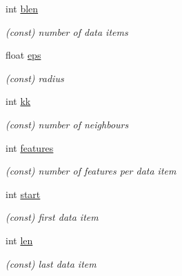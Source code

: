 \begin{DoxyCompactItemize}
\mbox{\label{structdbscan__pt_ac172b388c85db693e07e954f7d29e681}} 
int \mbox{\hyperlink{structdbscan__pt_ac172b388c85db693e07e954f7d29e681}{blen}}
\begin{DoxyCompactList}\small\item\em (const) number of data items \end{DoxyCompactList}\item 
\mbox{\label{structdbscan__pt_ae73ddeeaca04d08756b022115639d607}} 
float \mbox{\hyperlink{structdbscan__pt_ae73ddeeaca04d08756b022115639d607}{eps}}
\begin{DoxyCompactList}\small\item\em (const) radius \end{DoxyCompactList}\item 
\mbox{\label{structdbscan__pt_a07b73afdc253e16524b7eae0f6ec26b4}} 
int \mbox{\hyperlink{structdbscan__pt_a07b73afdc253e16524b7eae0f6ec26b4}{kk}}
\begin{DoxyCompactList}\small\item\em (const) number of neighbours \end{DoxyCompactList}\item 
\mbox{\label{structdbscan__pt_a22b641c18fac3731d31e9ded8c0c93eb}} 
int \mbox{\hyperlink{structdbscan__pt_a22b641c18fac3731d31e9ded8c0c93eb}{features}}
\begin{DoxyCompactList}\small\item\em (const) number of features per data item \end{DoxyCompactList}\item 
\mbox{\label{structdbscan__pt_ab35e524b61208589ee28bbf4a79341ae}} 
int \mbox{\hyperlink{structdbscan__pt_ab35e524b61208589ee28bbf4a79341ae}{start}}
\begin{DoxyCompactList}\small\item\em (const) first data item \end{DoxyCompactList}\item 
\mbox{\label{structdbscan__pt_a75fa5f27f7e41e5472087a847388daaf}} 
int \mbox{\hyperlink{structdbscan__pt_a75fa5f27f7e41e5472087a847388daaf}{len}}
\begin{DoxyCompactList}\small\item\em (const) last data item \end{DoxyCompactList}\item 

\end{DoxyCompactItemize}

